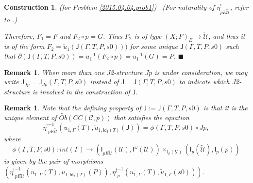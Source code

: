 \documentclass[12pt]{article}
\numberwithin{equation}{section}
\newtheorem{remark}[proposition]{Remark}
\newtheorem{construction0}[proposition]{Construction}
\newenvironment{construction}[1]{\begin{construction0}(for Problem \ref{#1})\ }{$\blacksquare$ \end{construction0}}
\newcommand{\sr}{\rightarrow}
\newcommand{\wt}{\widetilde}
\newcommand{\toCC}{CC} %
\newcommand{\C}{{\mathcal C}}  %
\newcommand{\Idx}{\mathsf{Id_3}} %
\newcommand{\J}{\mathsf{J}}
\newcommand{\U}{\mathcal{U}}
\newcommand{\I}{\mathsf{I}}
\newcommand{\etashriek}{\eta^!}
\newcommand{\etaunshriek}{{\etashriek}^{-1}}
\newcommand{\Obwt}{\wt{Ob}}
\begin{document}
\begin{construction}{2015.04.04.prob1}
(For naturality of $\etashriek_{pE\wt{\U}}$, refer to \cite[Problem 3.8(1)]{fromunivwithPi}.)

Therefore, $F_1 = F$ and $F_2 \circ p = G$.
Thus $F_2$ is of type $(X;F)_E\sr \wt{\U}$, and thus it is of the form
$F_2 = \wt{u}_{1}(\J(\Gamma,T,P,s0)))$ for some unique $\J(\Gamma,T,P,s0)$ such that $\partial(\J(\Gamma,T,P,s0)) = u_1^{-1}(F_2 \circ p)= u_1^{-1}(G) = P$.
\end{construction}

\begin{remark}
  When more than one J2-structure $Jp$ is under consideration, we may write $\J_{Jp} = \J_{Jp}(\Gamma,T,P,s0)$ instead of $\J = \J(\Gamma,T,P,s0)$
  to indicate which J2-structure is involved in the construction of $\J$.
\end{remark}

\begin{remark}\rm
\label{2015.05.08.rem1} Note that the defining property of
$\J := \J(\Gamma,T,P,s0)$ is that it is the unique element of
$\Obwt(\toCC({\C},p))$ that satisfies the equation
%
$$\etaunshriek_{pE\wt{\U}}(u_{1,\Gamma}(T),\wt{u}_{1,\Idx(T)}(\J))=\phi(\Gamma,T,P,s0)\circ
Jp,$$
%
where
%
$$\phi(\Gamma,T,P,s0):int(\Gamma)\sr
(\I_{pE\wt{\U}}(\U),\I^{\omega}(\U))\times_{\I_p(\U)}(\I_p(\wt{\U}),\I_p(p))$$
%
is given by the pair of morphisms $(\etaunshriek_{pE\wt{\U}}(u_{1,\Gamma}(T),
u_{1,\Idx(T)}(P)), \etaunshriek_p(u_{1,\Gamma}(T),\wt{u}_{1,\Gamma}(s0)))$.
\end{remark}
%
\end{document}
